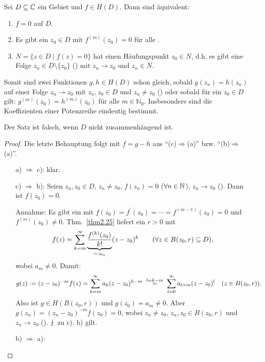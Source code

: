 \documentclass[a4paper,twoside,DIV15,BCOR12mm]{scrbook}
\begin{document}
\begin{thm}[Identitätssatz]
  Sei $D\subseteq\mathbb{C}$ ein Gebiet und $f\in H(D)$. Dann sind äquivalent:
  \begin{enumerate}
  \item $f=0$ auf $D$.
  \item Es gibt ein $z_0\in D$ mit $f^{(m)}(z_0)=0$ für alle .
  \item $N=\{ z\in D \mid f(z)=0 \}$ hat einen Häufungspunkt $z_0\in N$, d.h. es gibt eine Folge $z_n\in D\setminus\{z_0\}$
    () mit $z_n\to z_0$ und $z_n\in N$.
  \end{enumerate}
  Somit sind zwei Funktionen $g,h\in H(D)$ schon gleich, sobald $g(z_n)=h(z_n)$ auf einer Folge $z_n\to z_0$ mit $z_n,z_0\in D$
  und $z_n\neq z_0$ () oder sobald für ein $z_0\in D$ gilt: $g^{(m)}(z_0)=h^{(m)}(z_0)$ für alle
  $m\in\mathbb{N}_0$. Insbesondere sind die Koeffizienten einer Potenzreihe eindeutig bestimmt.
\end{thm}
\begin{bem*}
  Der Satz ist falsch, wenn $D$ nicht zusammenhängend ist.
\end{bem*}
\begin{proof}
  Die letzte Behauptung folgt mit $f=g-h$ aus "`(c)$\Rightarrow$(a)"' bzw. "`(b)$\Rightarrow$(a)"'.
  \begin{enumerate}
  \item[a)]$\!\Rightarrow$ c): klar.
  \item[c)]$\!\Rightarrow$ b): Seien $z_n,z_0\in D$, $z_n\neq z_0$, $f(z_n)=0$ ($\forall n\in\mathbb{N}$), $z_n\to z_0$ (\ninf). Dann
    ist $f(z_0) = 0$.

    Annahme: Es gibt ein  mit $f(z_0)=f^\prime(z_0)=\dotsb=f^{(m-1)}(z_0)=0$ und $f^{(m)}(z_0)\neq0$. Thm.~\ref{thm2.25}
    liefert ein $r>0$ mit
    \[ f(z)=\sum_{k=m}^\infty{\underbrace{\frac{f^{(k)}(z_0)}{k!}}_{=:a_n}(z-z_0)^k}\qquad(\forall z\in B(z_0,r)\subseteq D),\]
    wobei $a_m\neq0$. Damit:
    \[ g(z) \da (z-z_0)^{-m}f(z) = \sum_{k=m}^\infty{a_k(z-z_0)^{k-m}} \wegen{=}{l=k-m} \sum_{l=0}^\infty{a_{l+m}(z-z_0)^l}
    \quad (z\in B(z_0,r)).\]
    Also ist $g\in H(B(z_0,r))$ und $g(z_0)=a_m\neq0$. Aber $g(z_n)=(z_n-z_0)^{-m}f(z_0)=0$, wobei $z_n\neq z_0$, $z_n,z_0\in
    B(z_0,r)$ und $z_n\to z_0$ (\ninf). $\lightning$ zu c). \folgt b) gilt.
  \item[b)]$\!\Rightarrow$ a): \qedhere
  \end{enumerate}
\end{proof}
\end{document}
